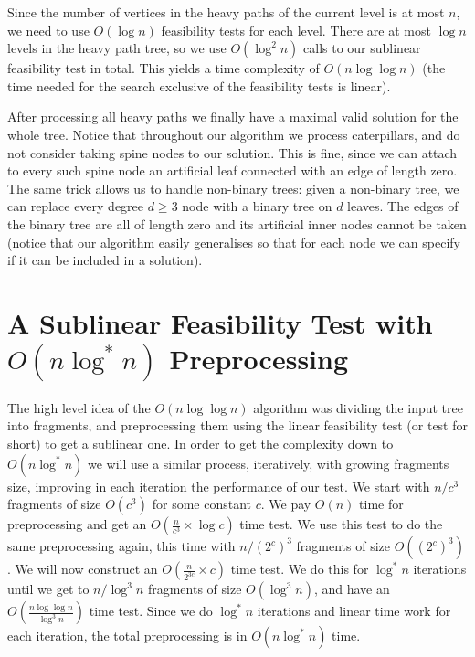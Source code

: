 \documentclass[11pt,a4paper]{article}
\theoremstyle{definition}
\theoremstyle{remark}
\begin{document}
Since the number of vertices in the heavy paths of the current level is at most $n$, we need to use $O(\log n)$ feasibility tests for each level. There are at most $\log n$ levels in the heavy path tree, so we use $O(\log ^2n)$ calls to our sublinear feasibility test in total. This yields a time complexity of $O(n \log \log n)$ (the time needed for the search exclusive of the feasibility tests is linear).

After processing all heavy paths we finally have a maximal valid solution for the whole tree.
Notice that throughout our algorithm we process caterpillars, and do not consider taking spine nodes to our solution. 
This is fine, since we can attach to every such spine node an artificial leaf connected with an edge of length zero.
The same trick allows us to handle non-binary trees: given a non-binary tree, we can replace every 
degree $d\geq 3$ node with a binary tree on $d$ leaves. The edges of the binary tree are all of length zero and
its artificial inner nodes cannot be taken (notice that our algorithm easily generalises so that for each node
we can specify if it can be included in a solution).

\section{A Sublinear Feasibility Test with \boldmath
$O(n\log^{*}n)$ Preprocessing} \label{sectionlog*}
The high level idea of the $O(n \log \log n)$ algorithm was dividing the input tree into fragments, and preprocessing them using the linear feasibility test (or test for short) to get a sublinear one. In order to get the complexity down to $O(n \log ^*n)$ we will use a similar process, iteratively, with growing fragments size, improving in each iteration the performance of our test.
We start with $n/c^{3}$ fragments of size $O(c^3)$ for some constant $c$.
We pay $O(n)$ time for preprocessing and get an $O(\frac{n}{c^3} \times \log c)$ time test.
We use this test to do the same preprocessing again, this time with $n/(2^{c})^{3}$ fragments of size $O((2^c)^3)$.
We will now construct an $O(\frac{n}{2^{3c}} \times c)$ time test.
We do this for $\log ^*n$ iterations until we get to $n/\log^{3}n$ fragments of size $O(\log ^3n)$, and have
an $O(\frac{n \log \log n}{\log ^3n})$ time test. Since we do $\log ^*n$ iterations and linear time work for each
iteration, the total preprocessing is in $O(n \log ^*n)$ time.
\end{document}
